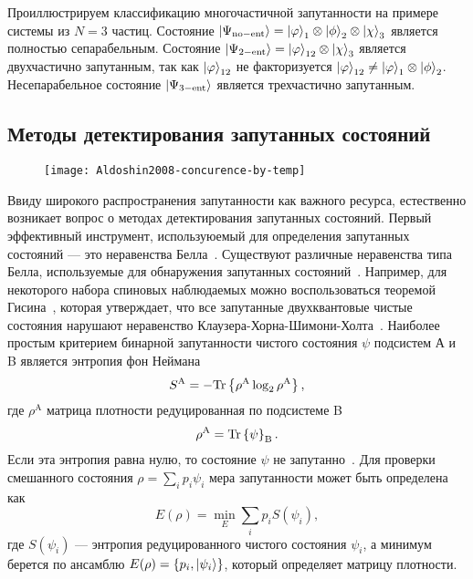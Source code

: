 \begin{definition}\label{def:manyparticle-entanglement}
  
\end{definition}

Проиллюстрируем классификацию многочастичной запутанности на примере системы из $N = 3$ частиц.
Состояние
$\left| \Psi_\mathrm{no-ent} \right\rangle = \left| \varphi \right\rangle_1 \otimes \left| \phi \right\rangle_2 \otimes \left| \chi \right\rangle_3$
является полностью сепарабельным.
Состояние
$\left| \Psi_{2-\mathrm{ent}} \right\rangle = \left| \varphi \right\rangle_{12} \otimes \left| \chi \right\rangle_3$
является двухчастично запутанным,
так как $\left| \varphi \right\rangle_{12}$ не факторизуется
$\left| \varphi \right\rangle_{12} \neq \left| \varphi \right\rangle_1 \otimes \left| \phi \right\rangle_2$.
Несепарабельное состояние $\left| \Psi_{3-\mathrm{ent}} \right\rangle$ является трехчастично запутанным.


\subsection{Методы детектирования запутанных состояний}
\label{sec:entanglement-criteria}

\begin{wrapfigure}{O}{0.5\textwidth}
    \centering
    \texttt{[image: Aldoshin2008-concurence-by-temp]}
    \caption{\protect}
    \label{fig:Aldoshin2008-concurence-by-temp}
\end{wrapfigure}

Ввиду широкого распространения запутанности как важного ресурса,
естественно возникает вопрос о методах детектирования запутанных состояний.
Первый эффективный инструмент,
используюемый для определения запутанных состояний --- это неравенства Белла~\cite{Bell1964}.
Существуют различные неравенства типа Белла, используемые для обнаружения запутанных состояний~\cite{Collins2002, Seevinck2001, Toth2005, Nagata2002, Yu2003, Laskowski2005, Schmid2008, Bancal2009, Svetlichny1987, Gisin1998}.
Например, для некоторого набора спиновых наблюдаемых можно воспользоваться теоремой Гисина~\cite{Gisin1991},
которая утверждает, что
все запутанные двухквантовые чистые состояния нарушают неравенство Клаузера-Хорна-Шимони-Холта~\cite{Clauser1969}.
Наиболее простым критерием бинарной запутанности чистого состояния $\psi$ подсистем А и B является энтропия фон Неймана
%
\begin{equation}
  S^\mathrm{A} = - \mathrm{Tr} \left\{ \rho^\mathrm{A} \log_2 \rho^\mathrm{A} \right\},
\end{equation}
%
где $\rho^\mathrm{A}$ матрица плотности редуцированная по подсистеме B
\begin{equation}
  \rho^\mathrm{A} = \mathrm{Tr} \left\{ \psi \right\}_\mathrm{B}.
\end{equation}
Если эта энтропия равна нулю, то состояние $\psi$ не запутанно~\cite{Bennett1996}.
Для проверки смешанного состояния $\rho = \sum_i p_i \psi_i$ мера запутанности может быть определена как
\begin{equation}
  E(\rho) = \min\limits_{E} \sum\limits_i p_i S(\psi_i),
\end{equation}
где $S(\psi_i)$ --- энтропия редуцированного чистого состояния $\psi_i$,
а минимум берется по ансамблю $E(\rho) = \left\{p_i, \left| \psi_i \right\rangle\right\}$,
который определяет матрицу плотности.

